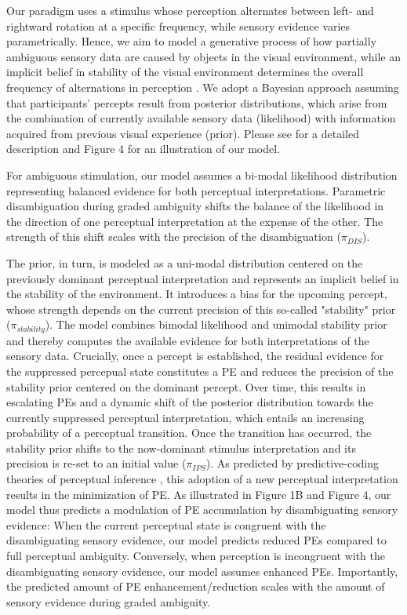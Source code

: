 \documentclass[12pt]{article}
\begin{document}
Our paradigm uses a stimulus whose perception alternates between left- and rightward rotation at a specific frequency, while sensory evidence varies parametrically. Hence, we aim to model a generative process of how partially ambiguous sensory data are caused by objects in the visual environment, while an implicit belief in stability of the visual environment determines the overall frequency of alternations in perception \parencite{Weilnhammer2017}. We adopt a Bayesian approach assuming that participants' percepts result from posterior distributions, which arise from the combination of currently available sensory data (likelihood) with information acquired from previous visual experience (prior). Please see \parencite{Weilnhammer2017} for a detailed description and Figure 4 for an illustration of our model. 

For ambiguous stimulation, our model assumes a bi-modal likelihood distribution representing balanced evidence for both perceptual interpretations. Parametric disambiguation during graded ambiguity shifts the balance of the likelihood in the direction of one perceptual interpretation at the expense of the other. The strength of this shift scales with the precision of the disambiguation ($\pi_{DIS}$). 

The prior, in turn, is modeled as a uni-modal distribution centered on the previously dominant perceptual interpretation and represents an implicit belief in the stability of the environment. It introduces a bias for the upcoming percept, whose strength depends on the current precision of this so-called "stability" prior ($\pi_{stability}$). The model combines bimodal likelihood and unimodal stability prior and thereby computes the available evidence for both interpretations of the sensory data. Crucially, once a percept is established, the residual evidence for the suppressed percepual state constitutes a PE and reduces the precision of the stability prior centered on the dominant percept. Over time, this results in escalating PEs and a dynamic shift of the posterior distribution towards the currently suppressed perceptual interpretation, which entails an increasing probability of a perceptual transition. Once the transition has occurred, the stability prior shifts to the now-dominant stimulus interpretation and its precision is re-set to an initial value ($\pi_{IPS}$). As predicted by predictive-coding theories of perceptual inference \parencite{Friston2005, Hohwy2008a}, this adoption of a new perceptual interpretation results in the minimization of PE. 
As illustrated in Figure 1B and Figure 4, our model thus predicts a modulation of PE accumulation by disambiguating sensory evidence: When the current perceptual state is congruent with the disambiguating sensory evidence, our model predicts reduced PEs compared to full perceptual ambiguity. Conversely, when perception is incongruent with the disambiguating sensory evidence, our model assumes enhanced PEs. Importantly, the predicted amount of PE enhancement/reduction scales with the amount of sensory evidence during graded ambiguity.
\end{document}
